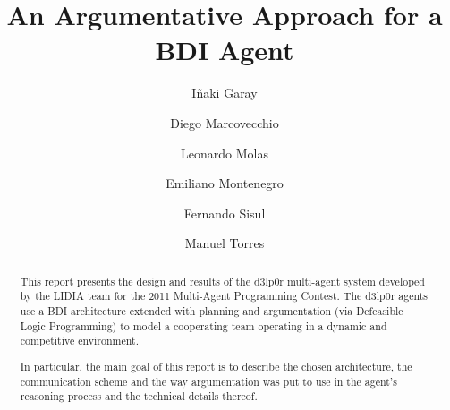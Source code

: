\documentclass{llncs2e/llncs}
\title{An Argumentative Approach for a BDI Agent} %
\author{Iñaki Garay \and 
        Diego Marcovecchio \and
        Leonardo Molas \and
        Emiliano Montenegro \and
        Fernando Sisul \and
        Manuel Torres
        }
\institute{Universidad Nacional del Sur}
\begin{document}
\frontmatter          %

\maketitle

\begin{comment}
\pagestyle{headings}  %
\addtocmark{Hamiltonian Mechanics} %

= Technical Report

figuras
- la arquitectura del agente
- la arquitectura del programa
- ejemplo del fog of war y coloreo

meter una buena explicacion de la arquitectura bdi en la parte de diseño
\end{comment}


\begin{abstract}
    This report presents the design and results of the d3lp0r multi-agent system 
    developed by the LIDIA team for the 2011 Multi-Agent Programming Contest.
    The d3lp0r agents use a BDI architecture extended with planning and 
    argumentation (via Defeasible Logic Programming) to model a cooperating team 
    operating in a dynamic and competitive environment.

    In particular, the main goal of this report is to describe the chosen 
    architecture, the communication scheme and the way argumentation was put to 
    use in the agent's reasoning process and the technical details thereof.
\end{abstract}
\end{document}
